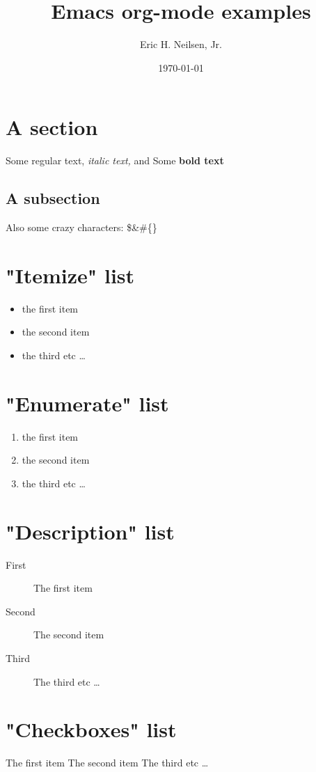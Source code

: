 \documentclass{article}%
\title{Emacs org{-}mode examples}%
\author{Eric H. Neilsen, Jr.}%
\date{\today}%
\begin{document}
%
\normalsize%
\maketitle%
\section{A section}%
\label{sec:A section}%
Some regular text, %
\textit{italic text, }%
and Some %
\textbf{bold text}%
\subsection{A subsection}%
\label{subsec:A subsection}%
Also some crazy characters: \$\&\#\{\}

%
\section{"Itemize" list}%
\label{sec:Itemize list}%
\begin{itemize}%
\item%
the first item%
\item%
the second item%
\item%
the third etc%
\ldots%
\end{itemize}

%
\section{"Enumerate" list}%
\label{sec:Enumerate list}%
\begin{enumerate}[label=\alph*),start=20]%
\item%
the first item%
\item%
the second item%
\item%
the third etc \ldots%
\end{enumerate}

%
\section{"Description" list}%
\label{sec:Description list}%
\begin{description}%
\item[First]%
The first item%
\item[Second]%
The second item%
\item[Third]%
The third etc \ldots%
\end{description}

%
\section{"Checkboxes" list}%
\label{sec:Checkboxes list}%
\begin{checkboxes}%
\choice%
The first item%
\CorrectChoice%
The second item%
\choice%
The third etc \ldots%
\end{checkboxes}

%
\end{document}
